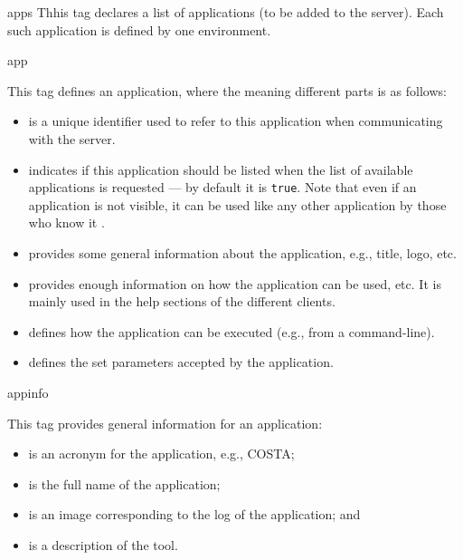 \bigskip
\xmlstruct
{apps}
{%
%
  Thhis tag declares a list of applications (to be added to the
  server). Each such application is defined by one 
  environment.  
%
} 
{}%

\bigskip
\xmlstruct
{app}
{%
%
  This tag defines an application, where the meaning different parts
  is as follows:
%
  \begin{itemize}

  \item {} is a unique identifier used to refer to
    this application when communicating with the server.

  \item {} indicates if this application should
    be listed when the list of available applications is requested ---
    by default it is \texttt{true}. 
    Note that even if an application is not visible, it can be used
    like any other application by those who know it
    .

  \item {} provides some general information about
    the application, e.g., title, logo, etc.

  \item {} provides enough information on how the
    application can be used, etc. It is mainly used in the help
    sections of the different clients.

  \item {} defines how the application can be
    executed (e.g., from a command-line).

  \item {} defines the set parameters accepted
    by the application.

  \end{itemize}
%
}
{}%


\bigskip
\xmlstruct
{appinfo}
{%
%
  This tag provides general information for an application:
%
  \begin{itemize}
  \item {} is an acronym for the application,
    e.g., COSTA;
  \item {} is the full name of the application;
  \item {} is an image corresponding to the log of
    the application; and
  \item {} is a description of the tool.
  \end{itemize}
%
}
{}%


